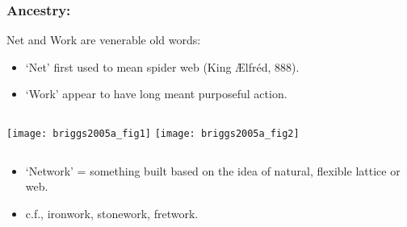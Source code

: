 \begin{frame}
  \frametitle{Ancestry:}

  \begin{block}{Net and Work are venerable old words:}
    \begin{itemize}
    \item
      \alert{`Net'} first used to mean spider web 
      {\small (King {\AE}lfr\'{e}d, 888)}.
    \item
      \alert{`Work'} appear to have long meant purposeful action.
    \end{itemize}
  \end{block}

  \begin{columns}
    \texttt{[image: briggs2005a\_fig1]}
    \texttt{[image: briggs2005a\_fig2]}
  \end{columns}

  \begin{block}{}
    \begin{itemize}
    \item<2->
      `Network' = something built
      based on the idea of natural, flexible lattice or web.
    \item<3-> 
      c.f., ironwork, stonework, fretwork.
    \end{itemize}
  \end{block}

\end{frame}

